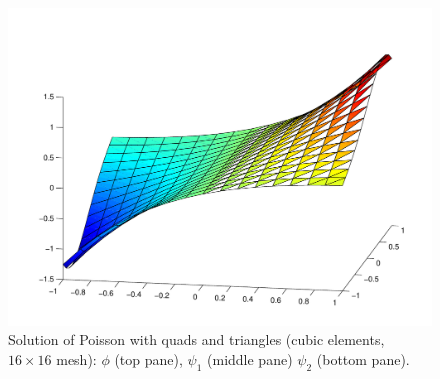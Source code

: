 \begin{figure}[hbh]
\begin{center}
\includegraphics[height=0.27\textheight]{plots/poissonHybrid/psi2cubic16x16.pdf}
\caption{Solution of Poisson with quads and triangles (cubic elements, $16 \times 16$ mesh):
$\phi$ (top pane),
$\psi_{1}$ (middle pane)
$\psi_{2}$ (bottom pane).}
\label{NVR:fig:Poisson}
\end{center}\end{figure}

